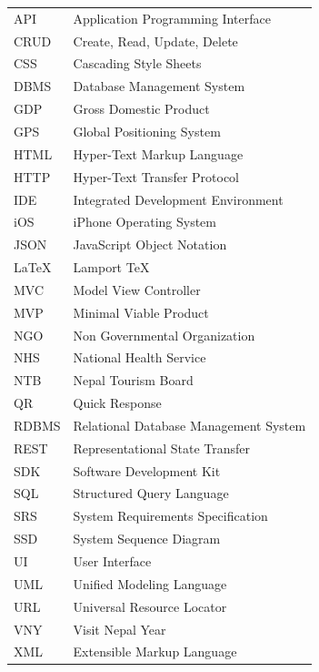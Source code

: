 \documentclass[12pt, a4paper, oneside]{article}
\begin{document}
\renewcommand{\arraystretch}{1.2}
\begin{table}[H]
\begin{tabular}{ll}
\normalsize

API & Application Programming Interface\\
CRUD	& Create, Read, Update, Delete\\
CSS		& Cascading Style Sheets\\
DBMS	& Database Management System\\
GDP		& Gross Domestic Product\\
GPS		& Global Positioning System\\
HTML	& Hyper-Text Markup Language\\
HTTP	& Hyper-Text Transfer Protocol\\
IDE		& Integrated Development Environment\\
iOS		& iPhone Operating System\\
JSON &	JavaScript Object Notation\\
LaTeX	& Lamport TeX\\
MVC		& Model View Controller\\
MVP		& Minimal Viable Product\\
NGO		& Non Governmental Organization\\
NHS		& National Health Service\\
NTB		& Nepal Tourism Board\\
QR		& Quick Response\\
RDBMS	& Relational Database Management System\\
REST	& Representational State Transfer\\
SDK		& Software Development Kit\\
SQL		& Structured Query Language\\
SRS		& System Requirements Specification\\
SSD		& System Sequence Diagram\\
UI		& User Interface\\
UML		& Unified Modeling Language\\
URL		& Universal Resource Locator\\
VNY		& Visit Nepal Year\\
XML		& Extensible Markup Language\\
\end{tabular}
\end{table}


\break

\cfoot{\textbf{\thepage} /  \pageref{LastPage}}
\normalsize
{}
\end{document}
